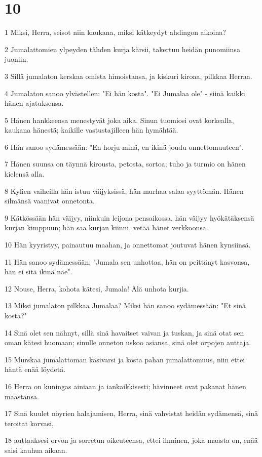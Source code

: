 \chapter{10}

\par 1 Miksi, Herra, seisot niin kaukana, miksi kätkeydyt ahdingon aikoina?
\par 2 Jumalattomien ylpeyden tähden kurja kärsii, takertuu heidän punomiinsa juoniin.
\par 3 Sillä jumalaton kerskaa omista himoistansa, ja kiskuri kiroaa, pilkkaa Herraa.
\par 4 Jumalaton sanoo ylvästellen: "Ei hän kosta". "Ei Jumalaa ole" - siinä kaikki hänen ajatuksensa.
\par 5 Hänen hankkeensa menestyvät joka aika. Sinun tuomiosi ovat korkealla, kaukana hänestä; kaikille vastustajilleen hän hymähtää.
\par 6 Hän sanoo sydämessään: "En horju minä, en ikinä joudu onnettomuuteen".
\par 7 Hänen suunsa on täynnä kirousta, petosta, sortoa; tuho ja turmio on hänen kielensä alla.
\par 8 Kylien vaiheilla hän istuu väijyksissä, hän murhaa salaa syyttömän. Hänen silmänsä vaanivat onnetonta.
\par 9 Kätkössään hän väijyy, niinkuin leijona pensaikossa, hän väijyy hyökätäksensä kurjan kimppuun; hän saa kurjan kiinni, vetää hänet verkkoonsa.
\par 10 Hän kyyristyy, painautuu maahan, ja onnettomat joutuvat hänen kynsiinsä.
\par 11 Hän sanoo sydämessään: "Jumala sen unhottaa, hän on peittänyt kasvonsa, hän ei sitä ikinä näe".
\par 12 Nouse, Herra, kohota kätesi, Jumala! Älä unhota kurjia.
\par 13 Miksi jumalaton pilkkaa Jumalaa? Miksi hän sanoo sydämessään: "Et sinä kosta?"
\par 14 Sinä olet sen nähnyt, sillä sinä havaitset vaivan ja tuskan, ja sinä otat sen oman kätesi huomaan; sinulle onneton uskoo asiansa, sinä olet orpojen auttaja.
\par 15 Murskaa jumalattoman käsivarsi ja kosta pahan jumalattomuus, niin ettei häntä enää löydetä.
\par 16 Herra on kuningas ainiaan ja iankaikkisesti; hävinneet ovat pakanat hänen maastansa.
\par 17 Sinä kuulet nöyrien halajamisen, Herra, sinä vahvistat heidän sydämensä, sinä teroitat korvasi,
\par 18 auttaaksesi orvon ja sorretun oikeuteensa, ettei ihminen, joka maasta on, enää saisi kauhua aikaan.

